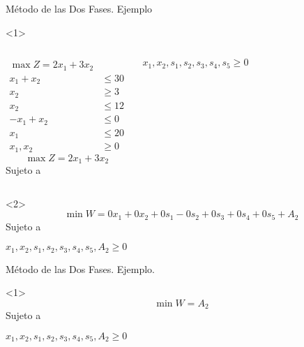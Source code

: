 \begin{frame}{Método de las Dos Fases. Ejemplo}{}
  \begin{onlyenv}<1>
      \begin{columns}
  \begin{align*}
    \max Z = 2x_1 + 3x_2 & \\[5mm]
    x_1 + x_2 & \leq 30\\
    x_2 & \geq 3\\
    x_2 & \leq 12\\
    -x_1 + x_2 & \leq 0\\
    x_1  & \leq 20 \\[5mm]
    x_1, x_2 & \geq 0
  \end{align*}  
\[ \max Z = 2x_1 + 3x_2\]
  Sujeto a 

$x_1, x_2, s_1, s_2, s_3, s_4, s_5  \geq 0$ 
\end{columns}
  \end{onlyenv}

\begin{onlyenv}<2>
    \[ \min W = 0x_1 + 0x_2 +0s_1 - 0s_2 + 0s_3 + 0s_4 + 0s_5 + A_2 \]
  Sujeto a 

$x_1, x_2, s_1, s_2, s_3, s_4, s_5, A_2  \geq 0$
\end{onlyenv}
\end{frame}

\begin{frame}{Método de las Dos Fases. Ejemplo.}{}
  \begin{onlyenv}<1>
    \[ \min W = A_2 \]
  Sujeto a 

$x_1, x_2, s_1, s_2, s_3, s_4, s_5, A_2  \geq 0$
\end{onlyenv}
\end{frame}

